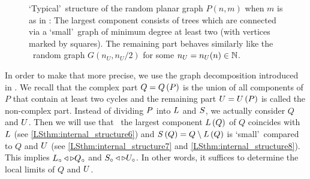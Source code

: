 \begin{figure}[t]
	\caption{\lq Typical\rq\ structure of the random planar graph $P(n,m)$ when $m$ is as in : The largest component consists of trees which are connected via a \lq small\rq\ graph of minimum degree at least two (with vertices marked by squares). The remaining part behaves similarly like the \ER\ random graph $G(n_U,n_U/2)$ for some $n_U=n_U(n)\in\mathbb{N}$.}
	\label{LSfig:local_structure_planar}
\end{figure}

In order to make that more precise, we use the graph decomposition introduced in . We recall that the complex part $Q=Q\left(P\right)$ is the union of all components of $P$ that contain at least two cycles and the remaining part $U=U\left(P\right)$ is called the non-complex part. Instead of dividing $P$ into $L$ and $S$, we actually consider $Q$ and $U$. Then we will use that \whp\ the largest component $L\left(Q\right)$ of $Q$ coincides with $L$ (see \ref{LSthm:internal_structure6}) and $S\left(Q\right)=Q\setminus L\left(Q\right)$ is \lq small\rq\ compared to $Q$ and $U$ (see \ref{LSthm:internal_structure7} and \ref{LSthm:internal_structure8}). This implies $L_\circ \triangleleft \triangleright Q_\circ$ and $S_\circ \triangleleft \triangleright U_\circ$. In other words, it suffices to determine the local limits of $Q$ and $U$. 

